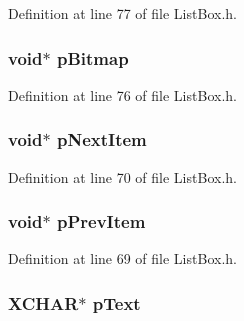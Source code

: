 Definition at line 77 of file List\+Box.\+h.

\hypertarget{struct_l_i_s_t_i_t_e_m_aef9bed8e1a29e17226ccbd9a3d81f9e1}{}
\subsubsection[{p\+Bitmap}]{\setlength{\rightskip}{0pt plus 5cm}void$\ast$ p\+Bitmap}\label{struct_l_i_s_t_i_t_e_m_aef9bed8e1a29e17226ccbd9a3d81f9e1}


Definition at line 76 of file List\+Box.\+h.

\hypertarget{struct_l_i_s_t_i_t_e_m_af5328877b08647c9f0ed84f22dca1616}{}
\subsubsection[{p\+Next\+Item}]{\setlength{\rightskip}{0pt plus 5cm}void$\ast$ p\+Next\+Item}\label{struct_l_i_s_t_i_t_e_m_af5328877b08647c9f0ed84f22dca1616}


Definition at line 70 of file List\+Box.\+h.

\hypertarget{struct_l_i_s_t_i_t_e_m_a7be6a1f7eb2ef84968680a3ea318e0ee}{}
\subsubsection[{p\+Prev\+Item}]{\setlength{\rightskip}{0pt plus 5cm}void$\ast$ p\+Prev\+Item}\label{struct_l_i_s_t_i_t_e_m_a7be6a1f7eb2ef84968680a3ea318e0ee}


Definition at line 69 of file List\+Box.\+h.

\hypertarget{struct_l_i_s_t_i_t_e_m_a934b5563cdaf14803728ff3a7b7e8c7f}{}
\subsubsection[{p\+Text}]{\setlength{\rightskip}{0pt plus 5cm}X\+C\+H\+A\+R$\ast$ p\+Text}\label{struct_l_i_s_t_i_t_e_m_a934b5563cdaf14803728ff3a7b7e8c7f}



